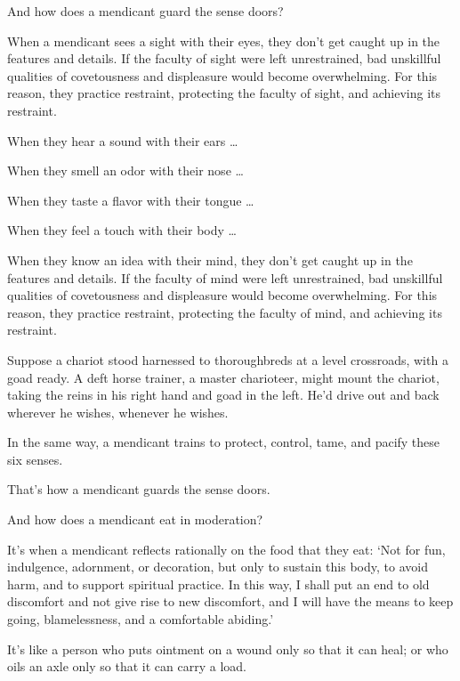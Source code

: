 \documentclass[12pt,openany]{book}%
\begin{document}
And how does a mendicant guard the sense doors? 

When a mendicant sees a sight with their eyes, they don’t get caught up in the features and details. If the faculty of sight were left unrestrained, bad unskillful qualities of covetousness and displeasure would become overwhelming. For this reason, they practice restraint, protecting the faculty of sight, and achieving its restraint. 

When they hear a sound with their ears … 

When they smell an odor with their nose … 

When they taste a flavor with their tongue … 

When they feel a touch with their body … 

When they know an idea with their mind, they don’t get caught up in the features and details. If the faculty of mind were left unrestrained, bad unskillful qualities of covetousness and displeasure would become overwhelming. For this reason, they practice restraint, protecting the faculty of mind, and achieving its restraint. 

Suppose a chariot stood harnessed to thoroughbreds at a level crossroads, with a goad ready. A deft horse trainer, a master charioteer, might mount the chariot, taking the reins in his right hand and goad in the left. He’d drive out and back wherever he wishes, whenever he wishes. 

In the same way, a mendicant trains to protect, control, tame, and pacify these six senses. 

That’s how a mendicant guards the sense doors. 

And how does a mendicant eat in moderation? 

It’s when a mendicant reflects rationally on the food that they eat: ‘Not for fun, indulgence, adornment, or decoration, but only to sustain this body, to avoid harm, and to support spiritual practice. In this way, I shall put an end to old discomfort and not give rise to new discomfort, and I will have the means to keep going, blamelessness, and a comfortable abiding.’ 

It’s like a person who puts ointment on a wound only so that it can heal; or who oils an axle only so that it can carry a load. 
\end{document}
